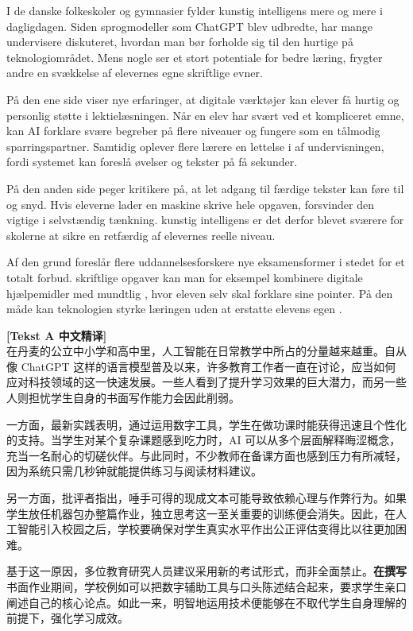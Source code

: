 I de danske folkeskoler og gymnasier fylder kunstig intelligens mere og mere i dagligdagen. Siden sprogmodeller som ChatGPT blev udbredte, har mange undervisere diskuteret, hvordan man bør forholde sig til den hurtige  på teknologiområdet. Mens nogle ser et stort potentiale for bedre læring, frygter andre en svækkelse af elevernes egne skriftlige evner.

På den ene side viser nye erfaringer, at  digitale værktøjer kan elever få hurtig og personlig støtte i lektielæsningen. Når en elev har svært ved et kompliceret emne, kan AI forklare svære begreber på flere niveauer og fungere som en tålmodig sparringspartner. Samtidig oplever flere lærere en lettelse i  af undervisningen, fordi systemet kan foreslå øvelser og tekster på få sekunder.

På den anden side peger kritikere på, at let adgang til færdige tekster kan føre til  og snyd. Hvis eleverne lader en maskine skrive hele opgaven, forsvinder den vigtige  i selvstændig tænkning.  kunstig intelligens er det derfor blevet sværere for skolerne at sikre en retfærdig  af elevernes reelle niveau.

Af den grund foreslår flere uddannelsesforskere nye eksamensformer i stedet for et totalt forbud.  skriftlige opgaver kan man for eksempel kombinere digitale hjælpemidler med mundtlig , hvor eleven selv skal forklare sine pointer. På den måde kan  teknologien styrke læringen uden at erstatte elevens egen .

\begin{transbox}
\small
\textbf{\color{NCDTeal}[Tekst A 中文精译]}\\
在丹麦的公立中小学和高中里，人工智能在日常教学中所占的分量越来越重。自从像 ChatGPT 这样的语言模型普及以来，许多教育工作者一直在讨论，应当如何应对科技领域的这一快速发展。一些人看到了提升学习效果的巨大潜力，而另一些人则担忧学生自身的书面写作能力会因此削弱。

一方面，最新实践表明，通过运用数字工具，学生在做功课时能获得迅速且个性化的支持。当学生对某个复杂课题感到吃力时，AI 可以从多个层面解释晦涩概念，充当一名耐心的切磋伙伴。与此同时，不少教师在备课方面也感到压力有所减轻，因为系统只需几秒钟就能提供练习与阅读材料建议。

另一方面，批评者指出，唾手可得的现成文本可能导致依赖心理与作弊行为。如果学生放任机器包办整篇作业，独立思考这一至关重要的训练便会消失。因此，在人工智能引入校园之后，学校要确保对学生真实水平作出公正评估变得比以往更加困难。

基于这一原因，多位教育研究人员建议采用新的考试形式，而非全面禁止。\textbf{在撰写}书面作业期间，学校例如可以把数字辅助工具与口头陈述结合起来，要求学生亲口阐述自己的核心论点。如此一来，明智地运用技术便能够在不取代学生自身理解的前提下，强化学习成效。
\end{transbox}

